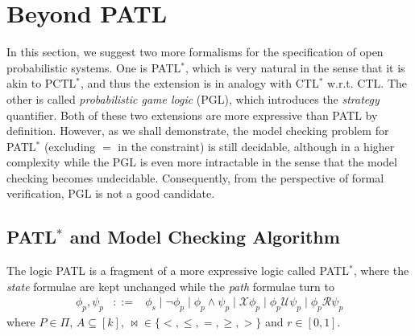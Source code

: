 \documentclass[times, 10 pt,twocolumn]{article}
\newcommand{\mc}[1]{\mathcal{#1}}
\begin{document}

\section{Beyond PATL} \label{sec4}

In this section, we suggest two more formalisms for the
specification of open probabilistic systems. One is PATL$^*$,
which is very natural in the sense that it is akin to PCTL$^*$,
and thus the extension is in analogy with CTL$^*$ w.r.t. CTL. The
other is called \emph{probabilistic game logic} (PGL), which
introduces the \emph{strategy} quantifier. Both of these two
extensions are more expressive than PATL by definition. However,
as we shall demonstrate, the model checking problem for PATL$^*$
(excluding $=$ in the constraint) is still decidable, although in
a higher complexity while the PGL is even more intractable in the
sense that the model checking becomes undecidable. Consequently,
from the perspective of formal verification, PGL is not a good
candidate.

\subsection{PATL$^*$ and Model Checking Algorithm}

The logic PATL is a fragment of a more expressive logic called
PATL$^*$, where the \emph{state} formulae are kept unchanged while
the \emph{path} formulae turn to
\begin{eqnarray*}
  \phi_p, \psi_p & ::= & \phi_s\mid \neg \phi_p\mid
  \phi_p \wedge \psi_p \mid \mc{X}\phi_p\mid \phi_p\mc{U}\psi_p \mid
  \phi_p\mc{R}\psi_p
\end{eqnarray*}
where $P\in \Pi$, $A\subseteq [k]$, $\bowtie \in\{<, \leq, =,
\geq, >\}$ and $r\in [0,1]$.
\end{document}
